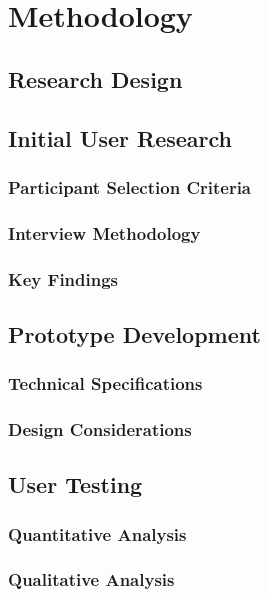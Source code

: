 %
\chapter{Methodology}
\label{sec:methodology}


\section{Research Design}
\label{sec:methodology:sec1}

\section{Initial User Research}
\label{sec:methodology:user-research}

\subsection{Participant Selection Criteria}
\label{sec:methodology:user-research:criteria}

\subsection{Interview Methodology}
\label{sec:methodology:user-research:interview}

\subsection{Key Findings}
\label{sec:methodology:user-research:findings}

\section{Prototype Development}
\label{sec:methodology:proptotype}

\subsection{Technical Specifications}
\label{sec:methodology:proptotype:specs}

\subsection{Design Considerations}
\label{sec:methodology:proptotype:design}

\section{User Testing}
\label{sec:methodology:testing}

\subsection{Quantitative Analysis}
\label{sec:methodology:testing:quantitative}

\subsection{Qualitative Analysis}
\label{sec:methodology:testing:qualitative}



